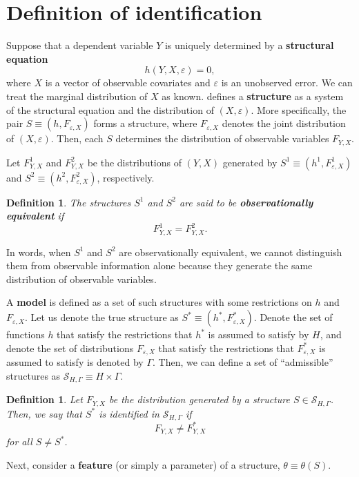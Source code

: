 \documentclass[10.5pt, A4paper, openany, uplatex]{book}
\newcommand{\mcl}{\mathcal}
\newcommand{\eps}{\varepsilon}
\newtheorem{definition}[theorem]{Definition}
\numberwithin{equation}{section}
\begin{document}
\section{Definition of identification}

Suppose that a dependent variable $Y$ is uniquely determined by a \textbf{structural equation}
\[
	h(Y, X, \eps) = 0,
\]
where $X$ is a vector of observable covariates and $\eps$ is an unobserved error.
We can treat the marginal distribution of $X$ as known.
\cite{hurwicz1950generalization} defines a \textbf{structure} as a system of the structural equation and the distribution of $(X, \eps)$.
More specifically, the pair $S \equiv (h, F_{\eps,X})$ forms a structure, where $F_{\eps,X}$ denotes the joint distribution of $(X, \eps)$.
Then, each $S$ determines the distribution of observable variables $F_{Y,X}$.

Let $F^1_{Y,X}$ and $F^2_{Y,X}$ be the distributions of $(Y, X)$ generated by $S^1 \equiv (h^1, F^1_{\eps,X})$ and $S^2 \equiv (h^2, F^2_{\eps,X})$, respectively.

\begin{definition}
	The structures $S^1$ and $S^2$ are said to be \textbf{observationally equivalent} if
	\[
	F^1_{Y,X} = F^2_{Y,X}.
	\]
\end{definition}
In words, when $S^1$ and $S^2$ are observationally equivalent, we cannot distinguish them from observable information alone because they generate the same distribution of observable variables.

A \textbf{model} is defined as a set of such structures with some restrictions on $h$ and $F_{\eps,X}$.
Let us denote the true structure as $S^* \equiv (h^*, F^*_{\eps,X})$.
Denote the set of functions $h$ that satisfy the restrictions that $h^*$ is assumed to satisfy by $H$, and denote the set of distributions $F_{\eps,X}$ that satisfy the restrictions that $F^*_{\eps,X}$ is assumed to satisfy is denoted by $\Gamma$.
Then, we can define a set of ``admissible'' structures as $\mcl{S}_{H,\Gamma} \equiv H \times \Gamma$.

\begin{definition}
	Let $F_{Y,X}$ be the distribution generated by a structure $S \in \mcl{S}_{H,\Gamma}$.
	Then, we say that $S^*$ is identified in $\mcl{S}_{H,\Gamma}$ if
	\[
	F_{Y,X} \neq F^*_{Y,X}
	\]
	for all $S \neq S^*$.
\end{definition} 

Next, consider a \textbf{feature} (or simply a parameter) of a structure, $\theta \equiv \theta(S)$.
\end{document}
